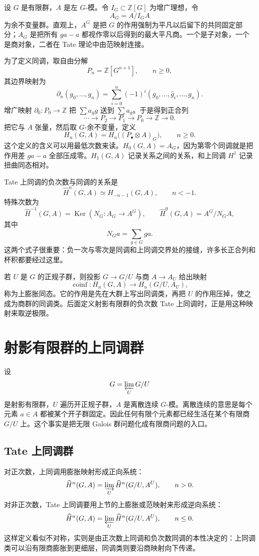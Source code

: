 \documentclass[11pt,a4paper,openany]{ctexbook}
\numberwithin{equation}{chapter}
\newcommand{\Z}{\mathbb{Z}}
\newcommand{\Ker}{\operatorname{Ker}}
\theoremstyle{plain}
\theoremstyle{definition}
\theoremstyle{remark}
\begin{document}
设 $G$ 是有限群，$A$ 是左 $G$-模。令 $I_G\subset \Z[G]$ 为增广理想，令
\[
A_G=A/I_GA
\]
为余不变量群。直观上，$A^G$ 是把 $G$ 的作用强制为平凡以后留下的共同固定部分；$A_G$ 是把所有 $ga-a$ 都视作零以后得到的最大平凡商。一个是子对象，一个是商对象，二者在 Tate 理论中由范映射连接。

为了定义同调，取自由分解
\[
P_n=\Z[G^{n+1}],\qquad n\geq 0,
\]
其边界映射为
\[
\partial_n(g_0,\ldots,g_n)
=\sum_{i=0}^n(-1)^i(g_0,\ldots,\widehat g_i,\ldots,g_n).
\]
增广映射 $\partial_0:P_0\to \Z$ 把 $\sum a_g g$ 送到 $\sum a_g$。于是得到正合列
\[
\cdots\longrightarrow P_2\longrightarrow P_1\longrightarrow P_0\longrightarrow \Z\longrightarrow 0.
\]
把它与 $A$ 张量，然后取 $G$-余不变量，定义
\[
H_n(G,A)=H_n\bigl((P_\bullet\otimes A)_G\bigr),\qquad n\geq 0.
\]
这个定义的含义可以用最低次数来读。$H_0(G,A)=A_G$，因为第零个同调就是把作用差 $ga-a$ 全部压成零。$H_1(G,A)$ 记录关系之间的关系，和上同调 $H^1$ 记录扭曲同态相对。

Tate 上同调的负次数与同调的关系是
\[
\widehat H^n(G,A)\simeq H_{-n-1}(G,A),\qquad n<-1.
\]
特殊次数为
\[
\widehat H^{-1}(G,A)=\Ker(N_G:A_G\to A^G),\qquad
\widehat H^0(G,A)=A^G/N_GA,
\]
其中
\[
N_Ga=\sum_{g\in G}ga.
\]
这两个式子很重要：负一次与零次是同调和上同调交界处的接缝，许多长正合列和杯积都要经过这里。

若 $U$ 是 $G$ 的正规子群，则投影 $G\to G/U$ 与商 $A\to A_U$ 给出映射
\[
\operatorname{coinf}:H_n(G,A)\longrightarrow H_n(G/U,A_U),
\]
称为上膨胀同态。它的作用是先在大群上写出同调类，再把 $U$ 的作用压掉，使之成为商群的同调类。后面定义射影有限群的负次数 Tate 上同调时，正是用这种映射来取逆极限。

\section{射影有限群的上同调群}

设
\[
G=\varprojlim_U G/U
\]
是射影有限群，$U$ 遍历开正规子群，$A$ 是离散连续 $G$-模。离散连续的意思是每个元素 $a\in A$ 都被某个开子群固定。因此任何有限个元素都已经生活在某个有限商 $G/U$ 上。这个事实是把无限 Galois 群问题化成有限商问题的入口。

\subsection{Tate 上同调群}

对正次数，上同调用膨胀映射形成正向系统：
\[
\widehat H^n(G,A)=\varinjlim_U \widehat H^n(G/U,A^U),\qquad n>0.
\]
对非正次数，Tate 上同调要用上节的上膨胀或范映射来形成逆向系统：
\[
\widehat H^n(G,A)=\varprojlim_U \widehat H^n(G/U,A^U),\qquad n\leq 0.
\]
这样定义看似不对称，实则是由正次数上同调和负次数同调的本性决定的：上同调类可以沿有限商膨胀到更细层，同调类则要沿商映射向下传递。
\end{document}
